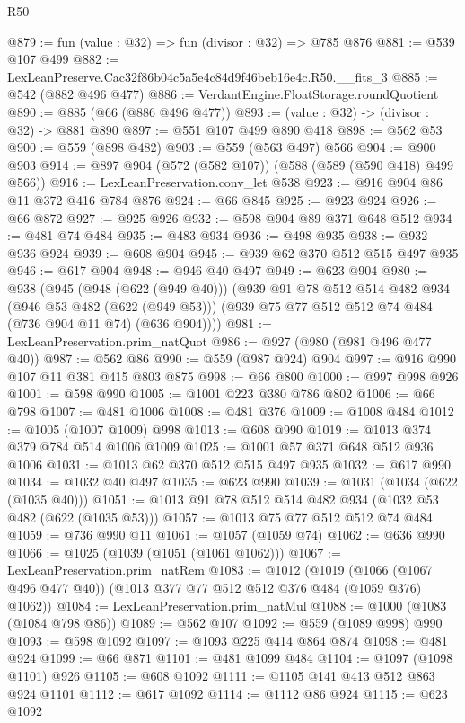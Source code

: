 \begin{lexlean}{R50}
\begin{coremodule}
@879 := fun (value : @32) => fun (divisor : @32) => @785 @876
@881 := @539 @107 @499
@882 := LexLeanPreserve.Cac32f86b04c5a5e4c84d9f46beb16e4c.R50.__fits_3
@885 := @542 (@882 @496 @477)
@886 := VerdantEngine.FloatStorage.roundQuotient
@890 := @885 (@66 (@886 @496 @477))
@893 := (value : @32) -> (divisor : @32) -> @881 @890
@897 := @551 @107 @499 @890 @418
@898 := @562 @53
@900 := @559 (@898 @482)
@903 := @559 (@563 @497) @566
@904 := @900 @903
@914 := @897 @904 (@572 (@582 @107)) (@588 (@589 (@590 @418) @499 @566))
@916 := LexLeanPreservation.conv_let @538
@923 := @916 @904 @86 @11 @372 @416 @784 @876
@924 := @66 @845
@925 := @923 @924
@926 := @66 @872
@927 := @925 @926
@932 := @598 @904 @89 @371 @648 @512
@934 := @481 @74 @484
@935 := @483 @934
@936 := @498 @935
@938 := @932 @936 @924
@939 := @608 @904
@945 := @939 @62 @370 @512 @515 @497 @935
@946 := @617 @904
@948 := @946 @40 @497
@949 := @623 @904
@980 := @938
    (@945
      (@948 (@622 (@949 @40)))
      (@939
        @91
        @78
        @512
        @514
        @482
        @934
        (@946 @53 @482 (@622 (@949 @53)))
        (@939 @75 @77 @512 @512 @74 @484 (@736 @904 @11 @74) (@636 @904))))
@981 := LexLeanPreservation.prim_natQuot
@986 := @927 (@980 (@981 @496 @477 @40))
@987 := @562 @86
@990 := @559 (@987 @924) @904
@997 := @916 @990 @107 @11 @381 @415 @803 @875
@998 := @66 @800
@1000 := @997 @998 @926
@1001 := @598 @990
@1005 := @1001 @223 @380 @786 @802
@1006 := @66 @798
@1007 := @481 @1006
@1008 := @481 @376
@1009 := @1008 @484
@1012 := @1005 (@1007 @1009) @998
@1013 := @608 @990
@1019 := @1013 @374 @379 @784 @514 @1006 @1009
@1025 := @1001 @57 @371 @648 @512 @936 @1006
@1031 := @1013 @62 @370 @512 @515 @497 @935
@1032 := @617 @990
@1034 := @1032 @40 @497
@1035 := @623 @990
@1039 := @1031 (@1034 (@622 (@1035 @40)))
@1051 := @1013 @91 @78 @512 @514 @482 @934 (@1032 @53 @482 (@622 (@1035 @53)))
@1057 := @1013 @75 @77 @512 @512 @74 @484
@1059 := @736 @990 @11
@1061 := @1057 (@1059 @74)
@1062 := @636 @990
@1066 := @1025 (@1039 (@1051 (@1061 @1062)))
@1067 := LexLeanPreservation.prim_natRem
@1083 := @1012
    (@1019 (@1066 (@1067 @496 @477 @40)) (@1013 @377 @77 @512 @512 @376 @484 (@1059 @376) @1062))
@1084 := LexLeanPreservation.prim_natMul
@1088 := @1000 (@1083 (@1084 @798 @86))
@1089 := @562 @107
@1092 := @559 (@1089 @998) @990
@1093 := @598 @1092
@1097 := @1093 @225 @414 @864 @874
@1098 := @481 @924
@1099 := @66 @871
@1101 := @481 @1099 @484
@1104 := @1097 (@1098 @1101) @926
@1105 := @608 @1092
@1111 := @1105 @141 @413 @512 @863 @924 @1101
@1112 := @617 @1092
@1114 := @1112 @86 @924
@1115 := @623 @1092

\end{coremodule}
\end{lexlean}
